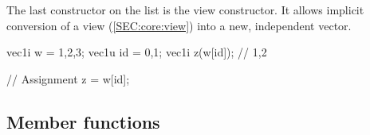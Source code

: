 \documentclass[12pt]{report}
\newenvironment{example}
{
    \begin{mdframed}[style=example,frametitle={Example}]
}
{
    \end{mdframed}
}
\begin{document}
\begin{itemize}
The last constructor on the list is the view constructor. It allows implicit conversion of a view (\ref{SEC:core:view}) into a new, independent vector.

\begin{example}
\begin{cppcode}
vec1i w = {1,2,3};
vec1u id = {0,1};
vec1i z(w[id]); // {1,2}

// Assignment
z = w[id];
\end{cppcode}
\end{example}

\end{itemize}

\subsection{Member functions \label{SEC:core:vec:member_fun}}
\end{document}
